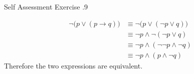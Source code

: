 \documentclass[\main/notes.tex]{subfiles}
\begin{document}
\begin{exercise}{Self Assessment Exercise \thechapter.9}
\begin{enumerate}
						\begin{align*}
							\lnot \bigl(p \lor (p \rightarrow q)\bigr) &\equiv \lnot \bigl(p \lor (\lnot p \lor q)\bigr) \tag*{Implication}\\
							& \equiv \lnot p \land \lnot(\lnot p \lor q) \tag*{De Morgan's law}\\
							& \equiv \lnot p \land (\lnot \lnot p \land \lnot q) \tag*{De Morgan's law}\\
							& \equiv \lnot p \land (p \land \lnot q) \tag*{Double Negation}
						\end{align*}
						Therefore the two expressions are equivalent.
				\end{enumerate}
			\end{exercise}
\end{document}
